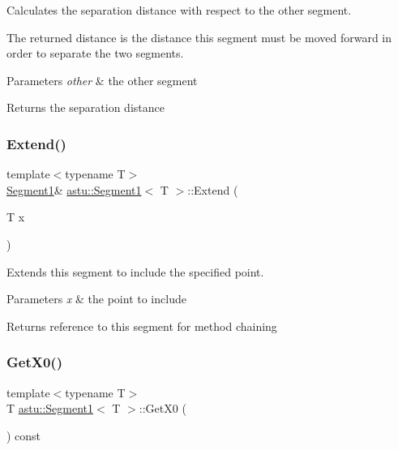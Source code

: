 Calculates the separation distance with respect to the other segment.

The returned distance is the distance this segment must be moved forward in order to separate the two segments.


\begin{DoxyParams}{Parameters}
{\em other} & the other segment \\
\hline
\end{DoxyParams}
\begin{DoxyReturn}{Returns}
the separation distance 
\end{DoxyReturn}
\mbox{\label{classastu_1_1Segment1_a7d71518f6990e41c6103b2a51864d95d}} 
\subsubsection{\texorpdfstring{Extend()}{Extend()}}
{\footnotesize\ttfamily template$<$typename T$>$ \\
\hyperlink{classastu_1_1Segment1}{Segment1}\& \hyperlink{classastu_1_1Segment1}{astu\+::\+Segment1}$<$ T $>$\+::Extend (\begin{DoxyParamCaption}\item[{T}]{x }\end{DoxyParamCaption})\hspace{0.3cm}{\ttfamily [inline]}}

Extends this segment to include the specified point.


\begin{DoxyParams}{Parameters}
{\em x} & the point to include \\
\hline
\end{DoxyParams}
\begin{DoxyReturn}{Returns}
reference to this segment for method chaining 
\end{DoxyReturn}
\mbox{\label{classastu_1_1Segment1_ac7daaba222bb4669afd375a113a8669e}} 
\subsubsection{\texorpdfstring{Get\+X0()}{GetX0()}}
{\footnotesize\ttfamily template$<$typename T$>$ \\
T \hyperlink{classastu_1_1Segment1}{astu\+::\+Segment1}$<$ T $>$\+::Get\+X0 (\begin{DoxyParamCaption}{ }\end{DoxyParamCaption}) const\hspace{0.3cm}{\ttfamily [inline]}}

